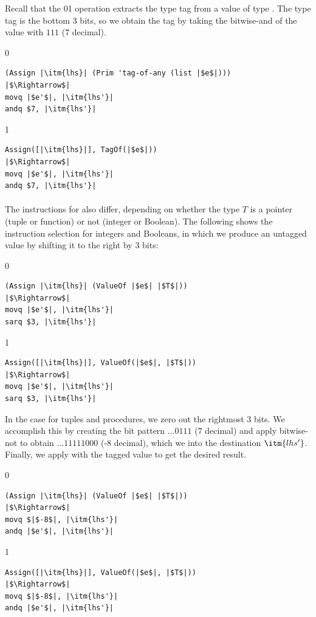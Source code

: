 \documentclass[7x10]{TimesAPriori_MIT}%
\def\racketEd{0}
\def\pythonEd{1}
\providecommand{\BookEdition}{1}
\let\edition\BookEdition
\newcommand{\racket}[1]{{\if\edition\racketEd{#1}\fi}}
\newcommand{\pythonColor}[0]{}
\newcommand{\python}[1]{{\if\edition\pythonEd\pythonColor #1\fi}}
\numberwithin{theorem}{chapter}
\numberwithin{definition}{chapter}
\numberwithin{equation}{chapter}
\begin{document}
Recall that the \racket{}\python{}
operation extracts the type tag from a value of type \ANYTY{}. The
type tag is the bottom $3$ bits, so we obtain the tag by taking the
bitwise-and of the value with $111$ ($7$ decimal).
%
{\if\edition\racketEd
\begin{lstlisting}
(Assign |\itm{lhs}| (Prim 'tag-of-any (list |$e$|)))
|$\Rightarrow$|
movq |$e'$|, |\itm{lhs'}|
andq $7, |\itm{lhs'}|
\end{lstlisting}
\fi}
%
{\if\edition\pythonEd\pythonColor
\begin{lstlisting}
Assign([|\itm{lhs}|], TagOf(|$e$|))
|$\Rightarrow$|
movq |$e'$|, |\itm{lhs'}|
andq $7, |\itm{lhs'}|
\end{lstlisting}
\fi}


\paragraph{}

The instructions for  also differ, depending on whether
the type $T$ is a pointer (tuple or function) or not (integer or
Boolean). The following shows the instruction
selection for integers and
Booleans, in which we produce an untagged value by shifting it to the
right by 3 bits:
%
{\if\edition\racketEd
\begin{lstlisting}
(Assign |\itm{lhs}| (ValueOf |$e$| |$T$|))
|$\Rightarrow$|
movq |$e'$|, |\itm{lhs'}|
sarq $3, |\itm{lhs'}|
\end{lstlisting}
\fi}
%
{\if\edition\pythonEd\pythonColor
\begin{lstlisting}
Assign([|\itm{lhs}|], ValueOf(|$e$|, |$T$|))
|$\Rightarrow$|
movq |$e'$|, |\itm{lhs'}|
sarq $3, |\itm{lhs'}|
\end{lstlisting}
\fi}
%
In the case for tuples and procedures, we zero out the rightmost 3
bits. We accomplish this by creating the bit pattern $\ldots 0111$
($7$ decimal) and apply bitwise-not to obtain $\ldots 11111000$ (-8
decimal), which we  into the destination $\itm{lhs'}$.
Finally, we apply  with the tagged value to get the desired
result.
%
{\if\edition\racketEd
\begin{lstlisting}
(Assign |\itm{lhs}| (ValueOf |$e$| |$T$|))
|$\Rightarrow$|
movq $|$-8$|, |\itm{lhs'}|
andq |$e'$|, |\itm{lhs'}|
\end{lstlisting}
\fi}
%
{\if\edition\pythonEd\pythonColor
\begin{lstlisting}
Assign([|\itm{lhs}|], ValueOf(|$e$|, |$T$|))
|$\Rightarrow$|
movq $|$-8$|, |\itm{lhs'}|
andq |$e'$|, |\itm{lhs'}|
\end{lstlisting}
\fi}
\end{document}

